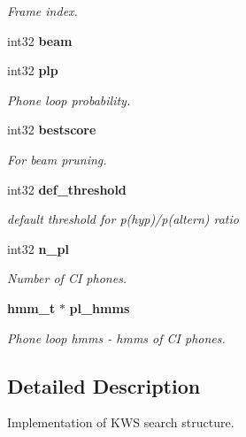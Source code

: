 \begin{DoxyCompactItemize}
\begin{DoxyCompactList}\small\item\em Frame index. \end{DoxyCompactList}\item 
int32 {\bfseries beam}\label{structkws__search__s_a5a84597099359059301dc6124579732e}

\item 
int32 {\bf plp}\label{structkws__search__s_a3bfc1d19e39d1cd321ce47280f1abe00}

\begin{DoxyCompactList}\small\item\em Phone loop probability. \end{DoxyCompactList}\item 
int32 {\bf bestscore}\label{structkws__search__s_a0a04bba471516468d1b2bea14632f255}

\begin{DoxyCompactList}\small\item\em For beam pruning. \end{DoxyCompactList}\item 
int32 {\bf def\+\_\+threshold}\label{structkws__search__s_afce4456a796dbc72149d7a47159ccca9}

\begin{DoxyCompactList}\small\item\em default threshold for p(hyp)/p(altern) ratio \end{DoxyCompactList}\item 
int32 {\bf n\+\_\+pl}\label{structkws__search__s_aab6e42d0c93af992c16e2a75db386df4}

\begin{DoxyCompactList}\small\item\em Number of C\+I phones. \end{DoxyCompactList}\item 
{\bf hmm\+\_\+t} $\ast$ {\bf pl\+\_\+hmms}\label{structkws__search__s_a7b501f4cc5f4efb7b4ca0259afcf4e05}

\begin{DoxyCompactList}\small\item\em Phone loop hmms -\/ hmms of C\+I phones. \end{DoxyCompactList}\end{DoxyCompactItemize}


\subsection{Detailed Description}
Implementation of K\+W\+S search structure. 

